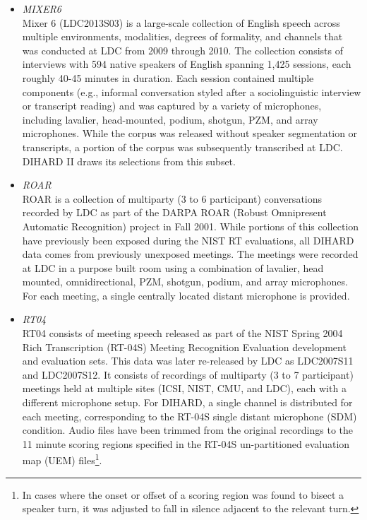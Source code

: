 \documentclass{article}
\begin{document}
\begin{appendices}
\begin{itemize}
            The Fisher English collection was performed in two phases, the first of which, comprising approximately 2,000 hours of audio from 12,000 speakers, has been released by LDC under catalog entries LDC2004S13, LDC2004T19, LDC2005S13, and LDC2005T19. A further 1,400 hours (from 1,300 speakers) were collected and transcribed during Phase II, but never released. For DIHARD III, we draw from these previously unexposed recordings.
        \item {\it MIXER6} \\
            Mixer 6 (LDC2013S03) is a large-scale collection of English speech across multiple environments, modalities, degrees of formality, and channels that was conducted at LDC from 2009 through 2010. The collection consists of interviews with 594 native speakers of English spanning 1,425 sessions, each roughly 40-45 minutes in duration. Each session contained multiple components (e.g., informal conversation styled after a sociolinguistic interview or transcript reading) and was captured by a variety of microphones, including lavalier, head-mounted, podium, shotgun, PZM, and array microphones. While the corpus was released without speaker segmentation or transcripts, a portion of the corpus was subsequently transcribed at LDC. DIHARD II draws its selections from this subset.
        \item {\it ROAR} \\
            ROAR is a collection of multiparty (3 to 6 participant) conversations recorded by LDC as part of the DARPA ROAR (Robust Omnipresent Automatic Recognition) project in Fall 2001. While portions of this collection have previously been exposed during the NIST RT evaluations, all DIHARD data comes from previously unexposed meetings. The meetings were recorded at LDC in a purpose built room using a combination of lavalier, head mounted, omnidirectional, PZM, shotgun, podium, and array microphones. For each meeting, a single centrally located distant microphone is provided.
        \item {\it RT04} \\
            RT04 consists of meeting speech released as part of the NIST Spring 2004 Rich Transcription (RT-04S) Meeting Recognition Evaluation development and evaluation sets. This data was later re-released by LDC as LDC2007S11 and LDC2007S12. It consists of recordings of multiparty (3 to 7 participant) meetings held at multiple sites (ICSI, NIST, CMU, and LDC), each with a different microphone setup. For DIHARD, a single channel is distributed for each meeting, corresponding to the RT-04S single distant microphone (SDM) condition. Audio files have been trimmed from the original recordings to the 11 minute scoring regions specified in the RT-04S un-partitioned evaluation map (UEM) files\footnote{In cases where the onset or offset of a scoring region was found to bisect a speaker turn, it was adjusted to fall in silence adjacent to the relevant turn.}.

\end{itemize}
\end{appendices}
\end{document}
